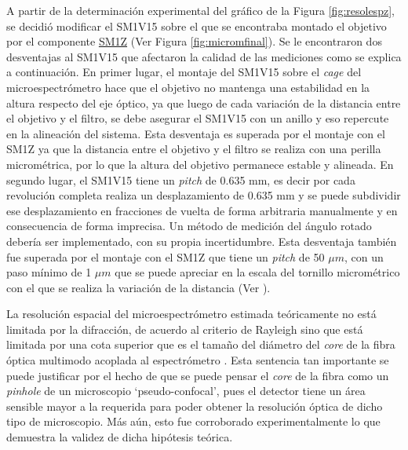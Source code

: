 A partir de la determinación experimental del gráfico de la Figura \ref{fig:resolespz}, se decidió modificar el SM1V15 sobre el que se encontraba montado el objetivo por el componente \href{https://www.thorlabs.com/thorProduct.cfm?partNumber=SM1Z#ad-image-0}{SM1Z} (Ver Figura \ref{fig:micromfinal}). Se le encontraron dos desventajas al SM1V15 que afectaron la calidad de las mediciones como se explica a continuación. En primer lugar, el montaje del SM1V15 sobre el \textit{cage} del microespectrómetro hace que el objetivo no mantenga una estabilidad en la altura respecto del eje óptico, ya que luego de cada variación de la distancia entre el objetivo y el filtro, se debe asegurar el SM1V15 con un anillo y eso repercute en la alineación del sistema. Esta desventaja es superada por el montaje con el SM1Z ya que la distancia entre el objetivo y el filtro se realiza con una perilla micrométrica, por lo que la altura del objetivo permanece estable y alineada. En segundo lugar, el SM1V15 tiene un \textit{pitch} de 0.635 mm, es decir por cada revolución completa realiza un desplazamiento de 0.635 mm y se puede subdividir ese desplazamiento en fracciones de vuelta de forma arbitraria manualmente y en consecuencia de forma imprecisa. Un método de medición del ángulo rotado debería ser implementado, con su propia incertidumbre. Esta desventaja también fue superada por el montaje con el SM1Z que tiene un \textit{pitch} de 50 $\mu m$, con un paso mínimo de 1 $\mu m$ que se puede apreciar en la escala del tornillo micrométrico con el que se realiza la variación de la distancia (Ver \href{https://www.thorlabs.com/images/ProductGallery/SM1Z/Z-Axis_Translation_Mount_30mm-AV3.jpg}{\faImage}). 

La resolución espacial del microespectrómetro estimada teóricamente no está limitada por la difracción, de acuerdo al criterio de Rayleigh sino que está limitada por una cota superior que es el tamaño del diámetro del \textit{core} de la fibra óptica multimodo acoplada al espectrómetro \cite{turrell}. Esta sentencia tan importante se puede justificar por el hecho de que se puede pensar el \textit{core} de la fibra como un \textit{pinhole} de un microscopio `pseudo-confocal', pues el detector tiene un área sensible mayor a la requerida para poder obtener la resolución óptica de dicho tipo de microscopio. Más aún, esto fue corroborado experimentalmente lo que demuestra la validez de dicha hipótesis teórica.

